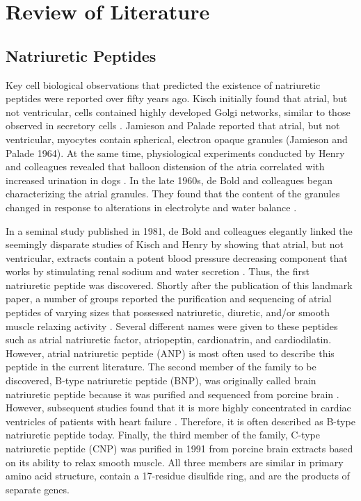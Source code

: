 \documentclass[14pt,a4paper,onecolumn]{article}
\begin{document}
\section{Review of Literature}

\subsection{Natriuretic Peptides}


Key cell biological observations that predicted the existence of natriuretic peptides were reported over fifty years ago. Kisch initially found that atrial, but not ventricular, cells contained highly developed Golgi networks, similar to those observed in secretory cells \citep{Kisch1956}. Jamieson and Palade reported that atrial, but not ventricular, myocytes contain spherical, electron opaque granules \citep{Jamieson1964}(Jamieson and Palade 1964). At the same time, physiological experiments conducted by Henry and colleagues revealed that balloon distension of the atria correlated with increased urination in dogs \citep{Henry1964}. In the late 1960s, de Bold and colleagues began characterizing the atrial granules. They found that the content of the granules changed in response to alterations in electrolyte and water balance \citep{deBold1981}.

In a seminal study published in 1981, de Bold and colleagues elegantly linked the seemingly disparate studies of Kisch and Henry by showing that atrial, but not ventricular, extracts contain a potent blood pressure decreasing component that works by stimulating renal sodium and water secretion \citep{deBold1981}. Thus, the first natriuretic peptide was discovered. Shortly after the publication of this landmark paper, a number of groups reported the purification and sequencing of atrial peptides of varying sizes that possessed natriuretic, diuretic, and/or smooth muscle relaxing activity \citep{Currie1984}  \citep{Flynn1983} \citep{Kangawa1984} \citep{Misono1984}.
 Several different names were given to these peptides such as atrial natriuretic factor, atriopeptin, cardionatrin, and cardiodilatin. However, atrial natriuretic peptide (ANP) is most often used to describe this peptide in the current literature. The second member of the family to be discovered, B-type natriuretic peptide (BNP), was originally called brain natriuretic peptide because it was purified and sequenced from porcine brain \citep{Sudoh1988}. However, subsequent studies found that it is more highly concentrated in cardiac ventricles of patients with heart failure \citep{Mukoyama1991}  \citep{Mukoyama1990}. Therefore, it is often described as B-type natriuretic peptide today. Finally, the third member of the family, C-type natriuretic peptide (CNP) \citep{Sudoh1990} was purified in 1991 from porcine brain extracts based on its ability to relax smooth muscle. All three members are similar in primary amino acid structure, contain a 17-residue disulfide ring, and are the products of separate genes.
\end{document}
